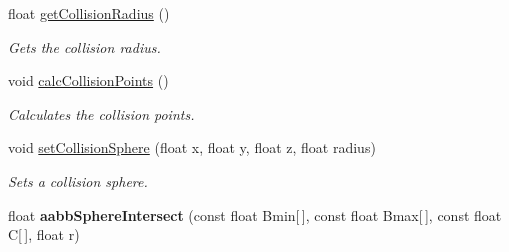 \begin{DoxyCompactItemize}
float \hyperlink{class_drawable_object_afd46e3cc8ce17bd5c3a9616aa98fad89}{get\-Collision\-Radius} ()
\begin{DoxyCompactList}\small\item\em Gets the collision radius. \end{DoxyCompactList}\item 
void \hyperlink{class_drawable_object_ae989c321292e8dc79a75d381d1979e6e}{calc\-Collision\-Points} ()
\begin{DoxyCompactList}\small\item\em Calculates the collision points. \end{DoxyCompactList}\item 
void \hyperlink{class_drawable_object_a6cc055383bb642fb76ba6d84623ff8c6}{set\-Collision\-Sphere} (float x, float y, float z, float radius)
\begin{DoxyCompactList}\small\item\em Sets a collision sphere. \end{DoxyCompactList}\item 
\hypertarget{class_drawable_object_a59a4aca514e030e14b91f836ae9f2775}{float {\bfseries aabb\-Sphere\-Intersect} (const float Bmin\mbox{[}$\,$\mbox{]}, const float Bmax\mbox{[}$\,$\mbox{]}, const float C\mbox{[}$\,$\mbox{]}, float r)}\label{class_drawable_object_a59a4aca514e030e14b91f836ae9f2775}


\end{DoxyCompactItemize}
